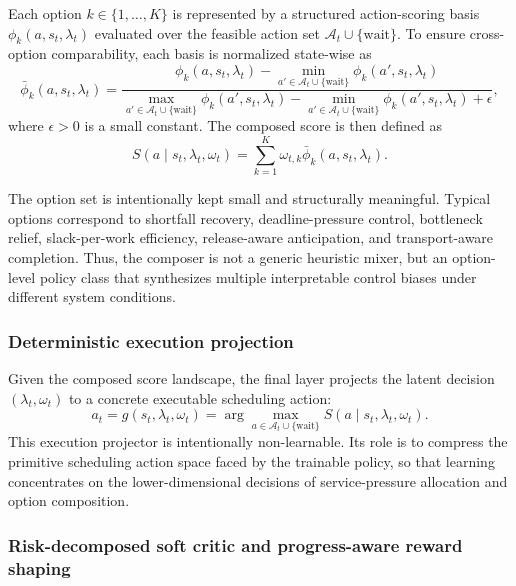 \documentclass[a4paper,fleqn]{cas-sc}
\begin{document}
Each option $k\in\{1,\ldots,K\}$ is represented by a structured action-scoring basis $\phi_k(a,s_t,\lambda_t)$ evaluated over the feasible action set $\mathcal{A}_t\cup\{\mathrm{wait}\}$. To ensure cross-option comparability, each basis is normalized state-wise as
\begin{equation}
\bar{\phi}_k(a,s_t,\lambda_t)=
\frac{
\phi_k(a,s_t,\lambda_t)-\min_{a' \in \mathcal{A}_t\cup\{\mathrm{wait}\}}\phi_k(a',s_t,\lambda_t)
}{
\max_{a' \in \mathcal{A}_t\cup\{\mathrm{wait}\}}\phi_k(a',s_t,\lambda_t)
-\min_{a' \in \mathcal{A}_t\cup\{\mathrm{wait}\}}\phi_k(a',s_t,\lambda_t)+\epsilon
},
\label{eq:normalized_option_basis}
\end{equation}
where $\epsilon>0$ is a small constant. The composed score is then defined as
\begin{equation}
S(a\mid s_t,\lambda_t,\omega_t)=
\sum_{k=1}^{K}\omega_{t,k}\bar{\phi}_k(a,s_t,\lambda_t).
\label{eq:score_composed}
\end{equation}

The option set is intentionally kept small and structurally meaningful. Typical options correspond to shortfall recovery, deadline-pressure control, bottleneck relief, slack-per-work efficiency, release-aware anticipation, and transport-aware completion. Thus, the composer is not a generic heuristic mixer, but an option-level policy class that synthesizes multiple interpretable control biases under different system conditions.

\subsubsection{Deterministic execution projection}

Given the composed score landscape, the final layer projects the latent decision $(\lambda_t,\omega_t)$ to a concrete executable scheduling action:
\begin{equation}
a_t=g(s_t,\lambda_t,\omega_t)=
\arg\max_{a\in\mathcal{A}_t\cup\{\mathrm{wait}\}}
S(a\mid s_t,\lambda_t,\omega_t).
\label{eq:project_action}
\end{equation}
This execution projector is intentionally non-learnable. Its role is to compress the primitive scheduling action space faced by the trainable policy, so that learning concentrates on the lower-dimensional decisions of service-pressure allocation and option composition.

\subsubsection{Risk-decomposed soft critic and progress-aware reward shaping}
\end{document}

